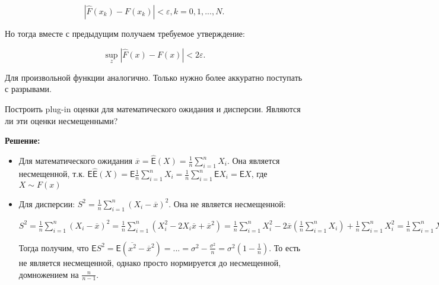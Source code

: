 \documentclass[12pt]{article}
\theoremstyle{definiton}
\theoremstyle{definition}
\theoremstyle{definition}
\let\epsilon\varepsilon
\newcommand{\Expect}{\mathsf{E}}
\newcounter{problem}
\newcounter{subproblem}
\def\prp{\medskip\noindent\stepcounter{problem}{\bf Задача \theproblem .  }\setcounter{subproblem}{0} }
\begin{document}
$$|\hat{F}(x_k) - F(x_k)| < \epsilon, k = 0,1,...,N.$$

Но тогда вместе с предыдущим получаем требуемое утверждение:

$$\sup\limits_z |\hat{F}(x) - F(x)| < 2\epsilon.$$

Для произвольной функции аналогично. Только нужно более аккуратно поступать с разрывами.


\prp Построить plug-in оценки для математического ожидания и дисперсии.
Являются ли эти оценки несмещенными?

\textbf{Решение: } 

\begin{itemize}
\item Для математического ожидания $\overline{x} = \hat{\Expect}(X) = \frac1n\sum\limits^n_{i=1} X_i$. Она является несмещенной, т.к. $\Expect\hat{\Expect}(X) = \Expect\frac1n\sum\limits^n_{i=1} X_i = \frac1n\sum\limits^n_{i=1} \Expect X_i = \Expect X$, где $X \sim F(x)$
\item Для дисперсии: $S^2 = \frac1n\sum\limits^n_{i=1} (X_i - \overline{x})^2$. Она не является несмещенной: 

$S^2 = \frac1n\sum\limits^n_{i=1} (X_i - \overline{x})^2 =
\frac1n\sum\limits^n_{i=1}(X_i^2 - 2X_i\overline{x} + \overline{x}^2) = \frac1n\sum\limits^n_{i=1}  X_i^2 - 2\overline{x}(\frac1n\sum\limits^n_{i=1} X_i) + \frac1n\sum\limits^n_{i=1} X_i^2 = \frac1{n}\sum\limits^n_{i=1} X_i^2 - \overline{x}^2  = \overline{x^2} - \overline{x}^2$

Тогда получим, что $\Expect S^2 = \Expect(\overline{x^2} - \overline{x}^2) = ... = \sigma^2 - \frac{\sigma^2}{n} = \sigma^2(1 - \frac1n)$. То есть не является несмещенной, однако просто нормируется до несмещенной, домножением на $\frac{n}{n-1}$.


\end{itemize}
\end{document}
